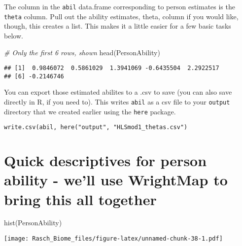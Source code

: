 \documentclass[
]{book}
\newenvironment{Shaded}{\begin{snugshade}}{\end{snugshade}}
\newcommand{\CommentTok}[1]{\textcolor[rgb]{0.56,0.35,0.01}{\textit{#1}}}
\newcommand{\FunctionTok}[1]{\textcolor[rgb]{0.00,0.00,0.00}{#1}}
\newcommand{\NormalTok}[1]{#1}
\newcommand{\OtherTok}[1]{\textcolor[rgb]{0.56,0.35,0.01}{#1}}
\newcommand{\SpecialCharTok}[1]{\textcolor[rgb]{0.00,0.00,0.00}{#1}}
\begin{document}
The column in the \texttt{abil} data.frame corresponding to person estimates is the \texttt{theta} column. Pull out the ability estimates, theta, column if you would like, though, this creates a list. This makes it a little easier for a few basic tasks below.

\begin{Shaded}
\end{Shaded}

\begin{Shaded}
\begin{Highlighting}[]
\CommentTok{\# Only the first 6 rows, shown}
\FunctionTok{head}\NormalTok{(PersonAbility)}
\end{Highlighting}
\end{Shaded}

\begin{verbatim}
## [1]  0.9846072  0.5861029  1.3941069 -0.6435504  2.2922517
## [6] -0.2146746
\end{verbatim}

You can export those estimated abilites to a .csv to save (you can also save directly in R, if you need to). This writes \texttt{abil} as a csv file to your \texttt{output} directory that we created earlier using the \texttt{here} package.

\begin{verbatim}
write.csv(abil, here("output", "HLSmod1_thetas.csv")
\end{verbatim}

\hypertarget{quick-descriptives-for-person-ability---well-use-wrightmap-to-bring-this-all-together}{%
\section{Quick descriptives for person ability - we'll use WrightMap to bring this all together}\label{quick-descriptives-for-person-ability---well-use-wrightmap-to-bring-this-all-together}}

\begin{Shaded}
\begin{Highlighting}[]
\FunctionTok{hist}\NormalTok{(PersonAbility)}
\end{Highlighting}
\end{Shaded}

\texttt{[image: Rasch\_Biome\_files/figure-latex/unnamed-chunk-38-1.pdf]}
\end{document}
